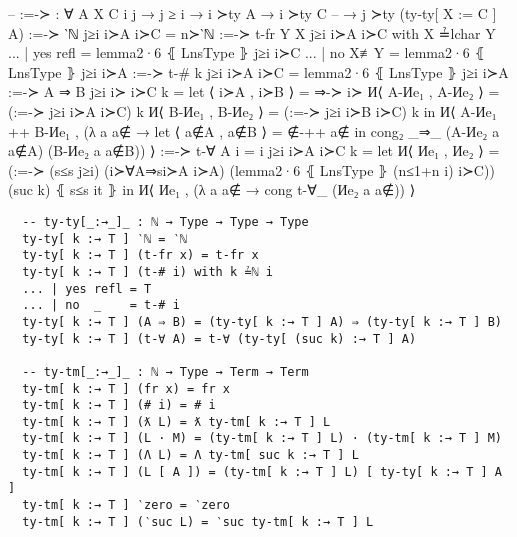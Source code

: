 \documentclass[logo,bsc,singlespacing,parskip,online]{infthesis}
\begin{document}
\begin{code}
  -- :=-≻ : ∀ {A X C i j} → j ≥ i → i ≻ty A → i ≻ty C
  --   → j ≻ty (ty-ty[ X := C ] A)
  :=-≻ {‵ℕ} j≥i i≻A i≻C = n≻‵ℕ
  :=-≻ {t-fr Y} {X} j≥i i≻A i≻C with X ≟lchar Y
  ... | yes refl = lemma2·6 ⦃ LnsType ⦄ j≥i i≻C
  ... | no  X≢Y  = lemma2·6 ⦃ LnsType ⦄ j≥i i≻A
  :=-≻ {t-# k} j≥i i≻A i≻C = lemma2·6 ⦃ LnsType ⦄ j≥i i≻A
  :=-≻ {A ⇒ B} j≥i i≻ i≻C k =
    let ⟨ i≻A , i≻B ⟩ = ⇒-≻ i≻
        И⟨ A-Иe₁ , A-Иe₂ ⟩ = (:=-≻ j≥i i≻A i≻C) k
        И⟨ B-Иe₁ , B-Иe₂ ⟩ = (:=-≻ j≥i i≻B i≻C) k
    in И⟨ A-Иe₁ ++ B-Иe₁ , (λ a {a∉} →
      let ⟨ a∉A , a∉B ⟩ = ∉-++ a∉
      in cong₂ _⇒_ (A-Иe₂ a {a∉A}) (B-Иe₂ a {a∉B})) ⟩
  :=-≻ {t-∀ A} {i = i}  j≥i i≻A i≻C k =
    let И⟨ Иe₁ , Иe₂ ⟩ = (:=-≻ (s≤s j≥i) (i≻∀A⇒si≻A i≻A) (lemma2·6 ⦃ LnsType ⦄ (n≤1+n i) i≻C)) (suc k) ⦃ s≤s it ⦄
    in И⟨ Иe₁ , (λ a {a∉} → cong t-∀_ (Иe₂ a {a∉})) ⟩
\end{code}

\begin{verbatim}
  -- ty-ty[_:→_]_ : ℕ → Type → Type → Type
  ty-ty[ k :→ T ] ‵ℕ = ‵ℕ
  ty-ty[ k :→ T ] (t-fr x) = t-fr x
  ty-ty[ k :→ T ] (t-# i) with k ≟ℕ i
  ... | yes refl = T
  ... | no  _    = t-# i
  ty-ty[ k :→ T ] (A ⇒ B) = (ty-ty[ k :→ T ] A) ⇒ (ty-ty[ k :→ T ] B)
  ty-ty[ k :→ T ] (t-∀ A) = t-∀ (ty-ty[ (suc k) :→ T ] A)

  -- ty-tm[_:→_]_ : ℕ → Type → Term → Term
  ty-tm[ k :→ T ] (fr x) = fr x
  ty-tm[ k :→ T ] (# i) = # i
  ty-tm[ k :→ T ] (ƛ L) = ƛ ty-tm[ k :→ T ] L
  ty-tm[ k :→ T ] (L · M) = (ty-tm[ k :→ T ] L) · (ty-tm[ k :→ T ] M)
  ty-tm[ k :→ T ] (Λ L) = Λ ty-tm[ suc k :→ T ] L
  ty-tm[ k :→ T ] (L [ A ]) = (ty-tm[ k :→ T ] L) [ ty-ty[ k :→ T ] A ]
  ty-tm[ k :→ T ] ‵zero = ‵zero
  ty-tm[ k :→ T ] (‵suc L) = ‵suc ty-tm[ k :→ T ] L
\end{verbatim}
\end{document}

